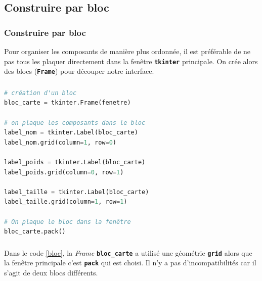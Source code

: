 \documentclass[svgnames,11pt]{beamer}
\begin{document}
\subsection{Construire par bloc}
\begin{frame}
    \frametitle{Construire par bloc}

    Pour organiser les composants de manière plus ordonnée, il est préférable de ne pas tous les plaquer directement dans la fenêtre \texttt{\textbf{tkinter}} principale. On crée alors des blocs (\textbf{\texttt{Frame}}) pour découper notre interface.


\end{frame}
\begin{frame}[fragile]
    \frametitle{}

    \begin{center}
        \begin{lstlisting}[language=Python , basicstyle=\ttfamily\small, xleftmargin=1em, xrightmargin=1em]
# création d'un bloc
bloc_carte = tkinter.Frame(fenetre)

# on plaque les composants dans le bloc
label_nom = tkinter.Label(bloc_carte)
label_nom.grid(column=1, row=0)

label_poids = tkinter.Label(bloc_carte)
label_poids.grid(column=0, row=1)

label_taille = tkinter.Label(bloc_carte)
label_taille.grid(column=1, row=1)

# On plaque le bloc dans la fenêtre
bloc_carte.pack()
\end{lstlisting}
        \label{bloc}
    \end{center}

\end{frame}
\begin{frame}
    \frametitle{}

    \begin{aretenir}[Remarque]
        Dans le code \ref{bloc}, la \emph{Frame} \textbf{\texttt{bloc\_carte}} a utilisé une géométrie \textbf{\texttt{grid}} alors que la fenêtre principale c'est \textbf{\texttt{pack}} qui est choisi. Il n'y a pas d'incompatibilités car il s'agit de deux blocs différents.
    \end{aretenir}

\end{frame}
\end{document}
